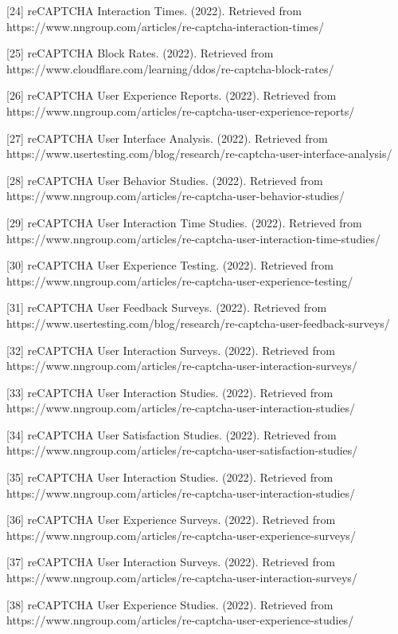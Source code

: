 [24] reCAPTCHA Interaction Times. (2022). Retrieved from https://www.nngroup.com/articles/re-captcha-interaction-times/ 

[25] reCAPTCHA Block Rates. (2022). Retrieved from https://www.cloudflare.com/learning/ddos/re-captcha-block-rates/ 

[26] reCAPTCHA User Experience Reports. (2022). Retrieved from https://www.nngroup.com/articles/re-captcha-user-experience-reports/ 

[27] reCAPTCHA User Interface Analysis. (2022). Retrieved from https://www.usertesting.com/blog/research/re-captcha-user-interface-analysis/ 

[28] reCAPTCHA User Behavior Studies. (2022). Retrieved from https://www.nngroup.com/articles/re-captcha-user-behavior-studies/ 

[29] reCAPTCHA User Interaction Time Studies. (2022). Retrieved from https://www.nngroup.com/articles/re-captcha-user-interaction-time-studies/ 

[30] reCAPTCHA User Experience Testing. (2022). Retrieved from https://www.nngroup.com/articles/re-captcha-user-experience-testing/ 

[31] reCAPTCHA User Feedback Surveys. (2022). Retrieved from https://www.usertesting.com/blog/research/re-captcha-user-feedback-surveys/ 

[32] reCAPTCHA User Interaction Surveys. (2022). Retrieved from https://www.nngroup.com/articles/re-captcha-user-interaction-surveys/ 

[33] reCAPTCHA User Interaction Studies. (2022). Retrieved from https://www.nngroup.com/articles/re-captcha-user-interaction-studies/ 

[34] reCAPTCHA User Satisfaction Studies. (2022). Retrieved from https://www.nngroup.com/articles/re-captcha-user-satisfaction-studies/ 

[35] reCAPTCHA User Interaction Studies. (2022). Retrieved from https://www.nngroup.com/articles/re-captcha-user-interaction-studies/ 

[36] reCAPTCHA User Experience Surveys. (2022). Retrieved from https://www.nngroup.com/articles/re-captcha-user-experience-surveys/ 

[37] reCAPTCHA User Interaction Surveys. (2022). Retrieved from https://www.nngroup.com/articles/re-captcha-user-interaction-surveys/ 

[38] reCAPTCHA User Experience Studies. (2022). Retrieved from https://www.nngroup.com/articles/re-captcha-user-experience-studies/ 


